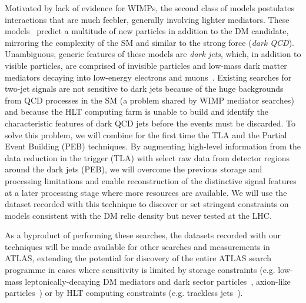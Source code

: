 \documentclass[11pt,a4paper]{article}
\begin{document}
Motivated by lack of evidence for WIMPs, the second class of models postulates interactions that are much feebler, generally involving lighter mediators. 
These models~\cite{Strassler:2006im,Cohen:2017pzm} predict a multitude of new particles in addition to the DM candidate, mirroring the complexity of the SM and similar to the strong force (\textit{dark QCD}). 
Unambiguous, generic features of these models are \textit{dark jets}, which, in addition to visible particles, are comprised of invisible particles and low-mass dark matter mediators decaying into low-energy electrons and muons~\cite{Curtin:2014cca}. 
Existing searches for two-jet signals are not sensitive to dark jets %
because of the huge backgrounds from QCD processes in the SM (a problem shared by WIMP mediator searches) and because the HLT computing farm is unable to build and identify the characteristic features of dark QCD jets before the events must be discarded. 
To solve this problem, we will combine for the first time the TLA and the Partial Event Building (PEB) techniques. %
By augmenting high-level information from the data reduction in the trigger (TLA) with select raw data from detector regions around the dark jets (PEB), we will overcome the previous storage and processing limitations and enable reconstruction of the distinctive signal features at a later processing stage where more resources are available. 
We will use the dataset recorded with this technique to discover or set stringent constraints on models consistent with the DM relic density but never tested at the LHC. %

As a byproduct of performing these searches, the datasets recorded with our techniques will be made available for other searches and measurements in ATLAS, extending the potential for discovery of the entire ATLAS search programme in cases where sensitivity is limited by storage constraints (e.g. low-mass leptonically-decaying DM mediators and dark sector particles~\cite{Hoenig:2014dsa}, axion-like particles~\cite{Mariotti:2017vtv}) or by HLT computing constraints (e.g. trackless jets~\cite{Daci:2015hca}).  
\end{document}
